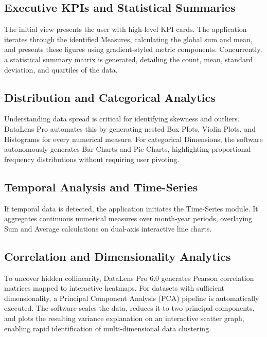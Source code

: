 \documentclass[12pt, a4paper]{article}
\begin{document}
\subsection{Executive KPIs and Statistical Summaries}
The initial view presents the user with high-level KPI cards. The application iterates through the identified Measures, calculating the global sum and mean, and presents these figures using gradient-styled metric components. Concurrently, a statistical summary matrix is generated, detailing the count, mean, standard deviation, and quartiles of the data. 
\subsection{Distribution and Categorical Analytics}
Understanding data spread is critical for identifying skewness and outliers. DataLens Pro automates this by generating nested Box Plots, Violin Plots, and Histograms for every numerical measure. For categorical Dimensions, the software autonomously generates Bar Charts and Pie Charts, highlighting proportional frequency distributions without requiring user pivoting.
\subsection{Temporal Analysis and Time-Series}
If temporal data is detected, the application initiates the Time-Series module. It aggregates continuous numerical measures over month-year periods, overlaying Sum and Average calculations on dual-axis interactive line charts. 
\subsection{Correlation and Dimensionality Analytics}
To uncover hidden collinearity, DataLens Pro 6.0 generates Pearson correlation matrices mapped to interactive heatmaps. For datasets with sufficient dimensionality, a Principal Component Analysis (PCA) pipeline is automatically executed. The software scales the data, reduces it to two principal components, and plots the resulting variance explanation on an interactive scatter graph, enabling rapid identification of multi-dimensional data clustering.
\end{document}
